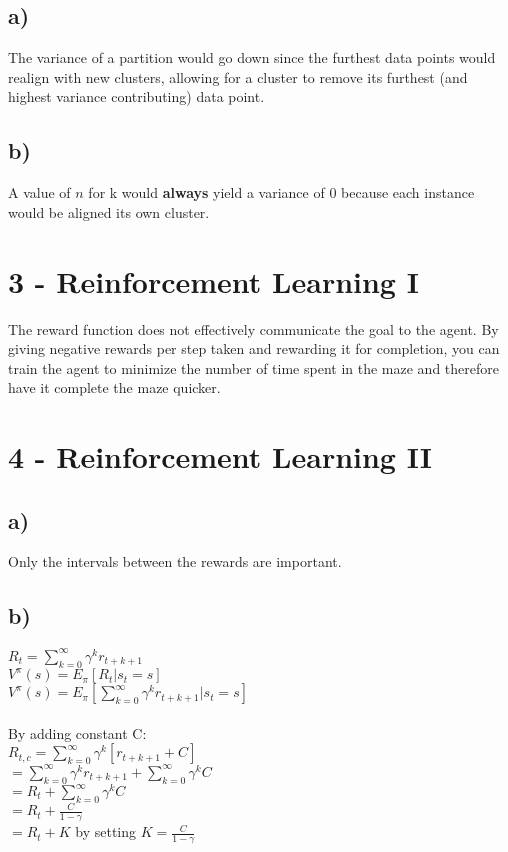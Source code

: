\documentclass[h]{article}
\begin{document}
\subsection*{a)}  
The variance of a partition would go down since the furthest data points would realign with new clusters, allowing for a cluster to remove its furthest (and highest variance contributing) data point.
\subsection*{b)} 
A value of $n$ for k would \textbf{always} yield a variance of 0 because each instance would be aligned its own cluster.

\section*{3 - Reinforcement Learning I}
The reward function does not effectively communicate the goal to the agent.  By giving negative rewards per step taken and rewarding it for completion, you can train the agent to minimize the number of time spent in the maze and therefore have it complete the maze quicker.

\section*{4 - Reinforcement Learning II}
\subsection*{a)}  Only the intervals between the rewards are important.
\subsection*{b)}
$R_t=\sum_{k=0}^{\infty}\gamma^kr_{t+k+1}$ \\
$V^\pi(s)=E_\pi[R_t \vert s_t = s]$\\
$V^\pi(s)=E_\pi[\sum_{k=0}^{\infty}\gamma^kr_{t+k+1} \vert s_t = s]$\\ \\
By adding constant C:\\
 $R_{t,c}=\sum_{k=0}^{\infty}\gamma^k[r_{t+k+1} + C]$ \\
 $=\sum_{k=0}^{\infty}\gamma^kr_{t+k+1} + \sum_{k=0}^{\infty}\gamma^kC$ \\
 $=R_t + \sum_{k=0}^{\infty}\gamma^kC$ \\
 $=R_t + \frac{C}{1-\gamma}$ \\
 $=R_t + K$ by setting $K = \frac{C}{1-\gamma}$ 
 
 

\end{document}
